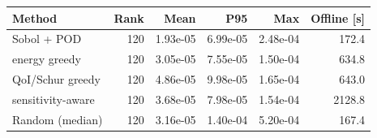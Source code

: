 \begin{tabular}{lrrrrr}
\toprule
Method & Rank & Mean & P95 & Max & Offline [s] \\
\midrule
Sobol + POD & 120 & 1.93e-05 & 6.99e-05 & 2.48e-04 & 172.4 \\
energy greedy & 120 & 3.05e-05 & 7.55e-05 & 1.50e-04 & 634.8 \\
QoI/Schur greedy & 120 & 4.86e-05 & 9.98e-05 & 1.65e-04 & 643.0 \\
sensitivity-aware & 120 & 3.68e-05 & 7.98e-05 & 1.54e-04 & 2128.8 \\
Random (median) & 120 & 3.16e-05 & 1.40e-04 & 5.20e-04 & 167.4 \\
\bottomrule
\end{tabular}
